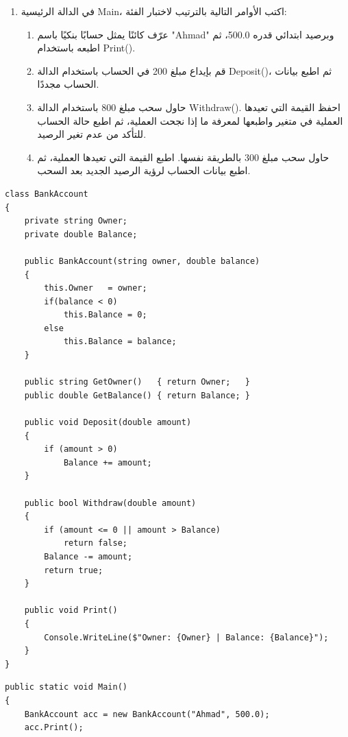\documentclass[14pt]{extarticle}
\begin{document}
\begin{enumerate}[itemsep=2em]
\begin{enumerate}[itemsep=1em]
    \item في الدالة الرئيسية \textenglish{Main}، اكتب الأوامر التالية بالترتيب لاختبار الفئة:
    \begin{enumerate}[itemsep=1pt, label=(\roman*)]
        \item عرّف كائنًا يمثل حسابًا بنكيًا باسم \textenglish{"Ahmad"} وبرصيد ابتدائي قدره \textenglish{500.0}، ثم اطبعه باستخدام \textenglish{Print()}.
        \item قم بإيداع مبلغ \textenglish{200} في الحساب باستخدام الدالة \textenglish{Deposit()}، ثم اطبع بيانات الحساب مجددًا.
        \item حاول سحب مبلغ \textenglish{800} باستخدام الدالة \textenglish{Withdraw()}. احفظ القيمة التي تعيدها العملية في متغير واطبعها لمعرفة ما إذا نجحت العملية، ثم اطبع حالة الحساب للتأكد من عدم تغير الرصيد.
        \item حاول سحب مبلغ \textenglish{300} بالطريقة نفسها. اطبع القيمة التي تعيدها العملية، ثم اطبع بيانات الحساب لرؤية الرصيد الجديد بعد السحب.
    \end{enumerate}
\end{enumerate}

\ifwithsols
{\small
\begin{boxSolution}
\begin{english}
\begin{verbatim}
class BankAccount
{
    private string Owner;
    private double Balance;

    public BankAccount(string owner, double balance)
    {
        this.Owner   = owner;
        if(balance < 0)
            this.Balance = 0;
        else
            this.Balance = balance;
    }

    public string GetOwner()   { return Owner;   }
    public double GetBalance() { return Balance; }

    public void Deposit(double amount)
    {
        if (amount > 0)
            Balance += amount;
    }

    public bool Withdraw(double amount)
    {
        if (amount <= 0 || amount > Balance)
            return false;
        Balance -= amount;
        return true;
    }

    public void Print()
    {
        Console.WriteLine($"Owner: {Owner} | Balance: {Balance}");
    }
}
\end{verbatim}
\end{english}
\end{boxSolution}
\begin{boxSolution}
\begin{english}
\begin{verbatim}
public static void Main()
{
    BankAccount acc = new BankAccount("Ahmad", 500.0);
    acc.Print();


\end{verbatim}
\end{english}
\end{boxSolution}}
\end{enumerate}
\end{document}
